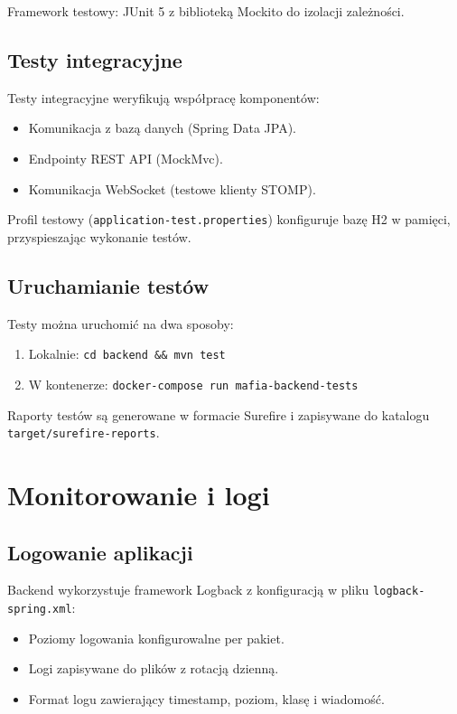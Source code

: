 ﻿\documentclass[a4paper,twoside,11pt]{mwrep}
\theoremstyle{plain} \newtheorem{thm}{Twierdzenie}
\theoremstyle{plain} \newtheorem{lem}{Lemat}
\theoremstyle{definition} \newtheorem{defn}{Definicja}
\theoremstyle{remark} \newtheorem*{rem}{Wniosek}
\begin{document}
Framework testowy: JUnit 5 z biblioteką Mockito do izolacji zależności.

\subsection{Testy integracyjne}

Testy integracyjne weryfikują współpracę komponentów:
\begin{itemize}
    \item Komunikacja z bazą danych (Spring Data JPA).
    \item Endpointy REST API (MockMvc).
    \item Komunikacja WebSocket (testowe klienty STOMP).
\end{itemize}

Profil testowy (\texttt{application-test.properties}) konfiguruje bazę H2 w pamięci, przyspieszając wykonanie testów.

\subsection{Uruchamianie testów}

Testy można uruchomić na dwa sposoby:
\begin{enumerate}
    \item Lokalnie: \texttt{cd backend \&\& mvn test}
    \item W kontenerze: \texttt{docker-compose run mafia-backend-tests}
\end{enumerate}

Raporty testów są generowane w formacie Surefire i zapisywane do katalogu \texttt{target/surefire-reports}.

\section{Monitorowanie i logi}

\subsection{Logowanie aplikacji}

Backend wykorzystuje framework Logback z konfiguracją w pliku \texttt{logback-spring.xml}:
\begin{itemize}
    \item Poziomy logowania konfigurowalne per pakiet.
    \item Logi zapisywane do plików z rotacją dzienną.
    \item Format logu zawierający timestamp, poziom, klasę i wiadomość.
\end{itemize}
\end{document}
